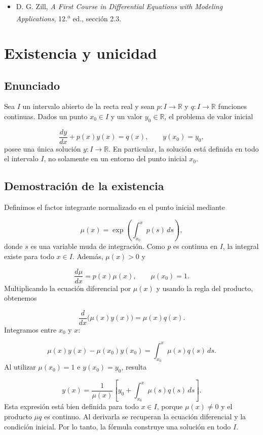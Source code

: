 \documentclass[12pt,a4paper]{article}
\begin{document}
	\begin{itemize}[leftmargin=*]
		\item D. G. Zill, \textit{A First Course in Differential Equations with Modeling Applications}, 12.\textsuperscript{a} ed., sección 2.3.
	\end{itemize}

	\clearpage
	\appendix
	\section{Existencia y unicidad}
	\label{ap:existencia-unicidad-lineales}

	\subsection{Enunciado}

	Sea \(I\) un intervalo abierto de la recta real y sean \(p:I\to\mathbb{R}\) y \(q:I\to\mathbb{R}\) funciones continuas. Dados un punto \(x_0\in I\) y un valor \(y_0\in\mathbb{R}\), el problema de valor inicial

	\[
	\frac{dy}{dx}+p(x)y(x)=q(x),
	\qquad
	y(x_0)=y_0,
	\]
	posee una única solución \(y:I\to\mathbb{R}\). En particular, la solución está definida en todo el intervalo \(I\), no solamente en un entorno del punto inicial \(x_0\).

	\subsection{Demostración de la existencia}

	Definimos el factor integrante normalizado en el punto inicial mediante

	\[
	\mu(x)
	=
	\exp\left(\int_{x_0}^{x}p(s)\,ds\right),
	\]
	donde \(s\) es una variable muda de integración. Como \(p\) es continua en \(I\), la integral existe para todo \(x\in I\). Además, \(\mu(x)>0\) y

	\[
	\frac{d\mu}{dx}=p(x)\mu(x),
	\qquad
	\mu(x_0)=1.
	\]
	Multiplicando la ecuación diferencial por \(\mu(x)\) y usando la regla del producto, obtenemos

	\[
	\frac{d}{dx}\bigl(\mu(x)y(x)\bigr)
	=
	\mu(x)q(x).
	\]
	Integramos entre \(x_0\) y \(x\):

	\[
	\mu(x)y(x)-\mu(x_0)y(x_0)
	=
	\int_{x_0}^{x}\mu(s)q(s)\,ds.
	\]
	Al utilizar \(\mu(x_0)=1\) e \(y(x_0)=y_0\), resulta

	\[
	\boxed{
	y(x)
	=
	\frac{1}{\mu(x)}
	\left[
	 y_0+\int_{x_0}^{x}\mu(s)q(s)\,ds
	\right].
	}
	\]
	Esta expresión está bien definida para todo \(x\in I\), porque \(\mu(x)\neq0\) y el producto \(\mu q\) es continuo. Al derivarla se recuperan la ecuación diferencial y la condición inicial. Por lo tanto, la fórmula construye una solución en todo \(I\).
\end{document}
